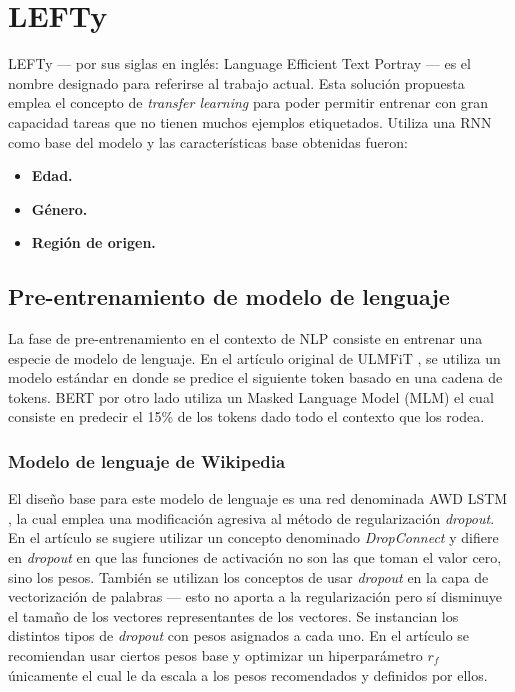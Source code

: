 
\chapter{LEFTy}

\label{Chapter5} %

LEFTy --- por sus siglas en inglés: Language Efficient Text Portray --- es el nombre designado para referirse al trabajo actual. Esta solución propuesta emplea el concepto de \textit{transfer learning} para poder permitir entrenar con gran capacidad tareas que no tienen muchos ejemplos etiquetados. Utiliza una RNN como base del modelo y las características base obtenidas fueron:

\begin{itemize}
\item \textbf{Edad.}
\item \textbf{Género.}
\item \textbf{Región de origen.}
\end{itemize}

\section{Pre-entrenamiento de modelo de lenguaje}

La fase de pre-entrenamiento en el contexto de NLP consiste en entrenar una especie de modelo de lenguaje. En el artículo original de ULMFiT \parencite{howard2018}, se utiliza un modelo estándar en donde se predice el siguiente token basado en una cadena de tokens. BERT \parencite{devlin2018bert} por otro lado utiliza un Masked Language Model (MLM) el cual consiste en predecir el 15\% de los tokens dado todo el contexto que los rodea.

\subsection{Modelo de lenguaje de Wikipedia}

El diseño base para este modelo de lenguaje es una red denominada AWD LSTM \parencite{merityRegOpt}, la cual emplea una modificación agresiva al método de regularización \textit{dropout}. En el artículo se sugiere utilizar un concepto denominado \textit{DropConnect} y difiere en \textit{dropout} en que las funciones de activación no son las que toman el valor cero, sino los pesos. También se utilizan los conceptos de usar \textit{dropout} en la capa de vectorización de palabras --- esto no aporta a la regularización pero sí disminuye el tamaño de los vectores representantes de los vectores. Se instancian los distintos tipos de \textit{dropout} con pesos asignados a cada uno. En el artículo se recomiendan usar ciertos pesos base y optimizar un hiperparámetro $r_f$ únicamente el cual le da escala a los pesos recomendados y definidos por ellos.

